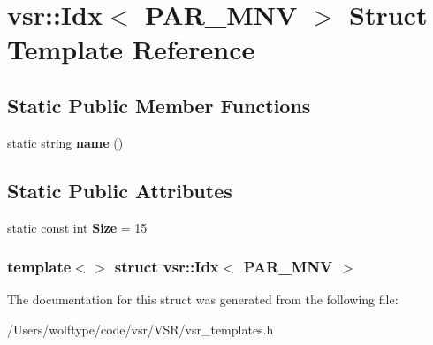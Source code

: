 \hypertarget{structvsr_1_1_idx_3_01_p_a_r___m_n_v_01_4}{\section{vsr\-:\-:Idx$<$ P\-A\-R\-\_\-\-M\-N\-V $>$ Struct Template Reference}
\label{structvsr_1_1_idx_3_01_p_a_r___m_n_v_01_4}
}
\subsection*{Static Public Member Functions}
\begin{DoxyCompactItemize}
\item 
\hypertarget{structvsr_1_1_idx_3_01_p_a_r___m_n_v_01_4_a87b224501bcc58546e95fedcc074f8dd}{static string {\bfseries name} ()}\label{structvsr_1_1_idx_3_01_p_a_r___m_n_v_01_4_a87b224501bcc58546e95fedcc074f8dd}

\end{DoxyCompactItemize}
\subsection*{Static Public Attributes}
\begin{DoxyCompactItemize}
\item 
\hypertarget{structvsr_1_1_idx_3_01_p_a_r___m_n_v_01_4_a0b8b808144c3490e525f424c7857dde6}{static const int {\bfseries Size} = 15}\label{structvsr_1_1_idx_3_01_p_a_r___m_n_v_01_4_a0b8b808144c3490e525f424c7857dde6}

\end{DoxyCompactItemize}
\subsubsection*{template$<$$>$ struct vsr\-::\-Idx$<$ P\-A\-R\-\_\-\-M\-N\-V $>$}



The documentation for this struct was generated from the following file\-:\begin{DoxyCompactItemize}
\item 
/\-Users/wolftype/code/vsr/\-V\-S\-R/vsr\-\_\-templates.\-h\end{DoxyCompactItemize}

